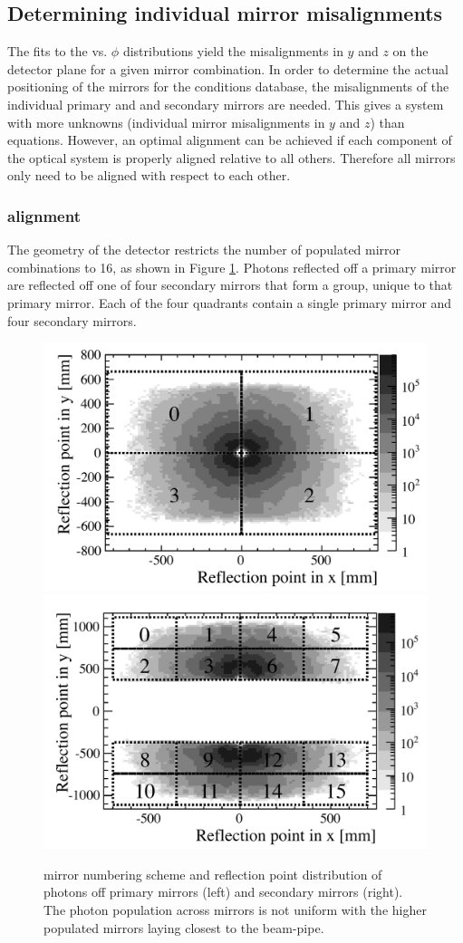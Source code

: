 \subsection{Determining individual mirror misalignments}
\label{subsec:IndivMirrAlign}
The fits to the \deltatheta vs. $\phi$ distributions yield the misalignments in $y$ and $z$ on the detector plane for a given mirror combination. In order to determine the actual positioning of the mirrors for the \lhcb conditions database, the misalignments of the individual primary and and secondary mirrors are needed. This gives a system with more unknowns (individual mirror misalignments in $y$ and $z$) than equations. However, an optimal alignment can be achieved if each component of the optical system is properly aligned relative to all others. Therefore all mirrors only need to be aligned with respect to each other.\\


\subsubsection{\richone alignment}
\label{subsec:Rich1Align}

The geometry of the \lhcb \richone detector restricts the number of populated mirror combinations to 16, as shown in Figure \ref{fig:RICH1_MirrorNumbering}. Photons reflected off a primary mirror are reflected off one of four secondary mirrors that form a group, unique to that primary mirror. Each of the four quadrants contain a single primary mirror and four secondary mirrors.
\begin{figure}[htbp]
  \vspace{-0.5\baselineskip}
  \centering
  \includegraphics[width=.48\textwidth]{figs/Method/RICH1_PrimaryMirrors.pdf}
  \includegraphics[width=.48\textwidth]{figs/Method/RICH1_SecondaryMirrors.pdf}
  \vspace{-0.5\baselineskip}
  \caption{
    \richone mirror numbering scheme and reflection point distribution of photons off \richone primary mirrors (left) and secondary mirrors (right). The photon population across mirrors is not uniform with the higher populated mirrors laying closest to the beam-pipe.}
  \label{fig:RICH1_MirrorNumbering}
  \vspace{-0.5\baselineskip}
\end{figure}

